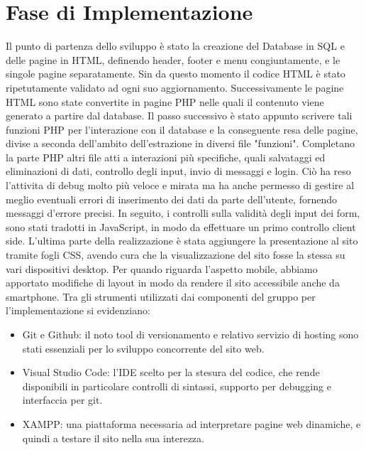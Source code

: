 \section{Fase di Implementazione}

Il punto di partenza dello sviluppo è stato la creazione del Database in SQL e delle pagine in HTML, definendo header, footer e menu congiuntamente, e le singole pagine separatamente. Sin da questo momento il codice HTML è stato ripetutamente validato ad ogni suo aggiornamento. Successivamente le pagine HTML sono state convertite in pagine PHP nelle quali il contenuto viene generato a partire dal database.
Il passo successivo è stato appunto scrivere tali funzioni PHP per l’interazione con il database e la conseguente resa delle pagine, divise a seconda dell'ambito dell'estrazione in diversi file "funzioni". Completano la parte PHP altri file atti a interazioni più specifiche, quali salvataggi ed eliminazioni di dati, controllo degli input, invio di messaggi e login.
Ciò ha reso l’attivita di debug molto più veloce e mirata ma ha anche permesso di gestire al meglio eventuali errori di inserimento dei dati da parte dell’utente, fornendo messaggi d’errore precisi. In seguito, i controlli sulla validità degli input dei form, sono stati tradotti in JavaScript, in modo da effettuare un primo controllo client side.
L’ultima parte della realizzazione è stata aggiungere la presentazione al sito tramite fogli CSS, avendo cura che la visualizzazione del sito fosse la stessa su vari dispositivi desktop. Per quando riguarda l’aspetto mobile, abbiamo apportato modifiche di layout in modo da rendere il sito accessibile anche da smartphone.
Tra gli strumenti utilizzati dai componenti del gruppo per l'implementazione si evidenziano:
\begin{itemize}
    \item Git e Github: il noto tool di versionamento e relativo servizio di hosting sono stati essenziali per lo sviluppo concorrente del sito web.
    \item Visual Studio Code: l'IDE scelto per la stesura del codice, che rende disponibili in particolare controlli di sintassi, supporto per debugging e interfaccia per git.
    \item XAMPP: una piattaforma necessaria ad interpretare pagine web dinamiche, e quindi a testare il sito nella sua interezza.
\end{itemize}
\pagebreak
